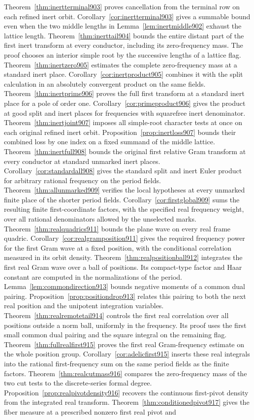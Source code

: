 \documentclass[a4paper,11pt]{article}
\theoremstyle{definition}
\theoremstyle{remark}
\numberwithin{equation}{section}
\begin{document}
Theorem~\ref{thm:inertterminal903} proves cancellation from the terminal row on each refined inert orbit. Corollary~\ref{cor:inertterminal903} gives a summable bound even when the two middle lengths in Lemma~\ref{lem:inertmiddle902} exhaust the lattice length. Theorem~\ref{thm:inerttail904} bounds the entire distant part of the first inert transform at every conductor, including its zero-frequency mass. The proof chooses an interior simple root by the successive lengths of a lattice flag. Theorem~\ref{thm:inertzero905} estimates the complete zero-frequency mass at a standard inert place. Corollary~\ref{cor:inertproduct905} combines it with the split calculation in an absolutely convergent product on the same fields. Theorem~\ref{thm:inertprime906} proves the full first transform at a standard inert place for a pole of order one. Corollary~\ref{cor:primeproduct906} gives the product at good split and inert places for frequencies with squarefree inert denominator. Theorem~\ref{thm:inertjoint907} imposes all simple-root character tests at once on each original refined inert orbit. Proposition~\ref{prop:inertloss907} bounds their combined loss by one index on a fixed summand of the middle lattice. Theorem~\ref{thm:inertfull908} bounds the original first relative Gram transform at every conductor at standard unmarked inert places. Corollary~\ref{cor:standardall908} gives the standard split and inert Euler product for arbitrary rational frequency on the period fields. Theorem~\ref{thm:allunmarked909} verifies the local hypotheses at every unmarked finite place of the shorter period fields. Corollary~\ref{cor:firstglobal909} sums the resulting finite first-coordinate factors, with the specified real frequency weight, over all rational denominators allowed by the unselected marks. Theorem~\ref{thm:realquadrics911} bounds the plane wave on every real frame quadric. Corollary~\ref{cor:realgramposition911} gives the required frequency power for the first Gram wave at a fixed position, with the conditional correlation measured in its orbit density. Theorem~\ref{thm:realpositionball912} integrates the first real Gram wave over a ball of positions. Its compact-type factor and Haar constant are computed in the normalizations of the period. Lemma~\ref{lem:commondirection913} bounds negative moments of a common dual pairing. Proposition~\ref{prop:positiondrop913} relates this pairing to both the next real position and the unipotent integration variables. Theorem~\ref{thm:realremotetail914} controls the first real correlation over all positions outside a norm ball, uniformly in the frequency. Its proof uses the first small common dual pairing and the square integral on the remaining flag. Theorem~\ref{thm:fullrealfirst915} proves the first real Gram-frequency estimate on the whole position group. Corollary~\ref{cor:adelicfirst915} inserts these real integrals into the rational first-frequency sum on the same period fields as the finite factors. Theorem~\ref{thm:realcutmass916} compares the zero-frequency mass of the two cut tests to the discrete-series formal degree. Proposition~\ref{prop:realpivotdensity916} recovers the continuous first-pivot density from the integrated real transform. Theorem~\ref{thm:conditionedpivot917} gives the fiber measure at a prescribed nonzero first real pivot and 
\end{document}
